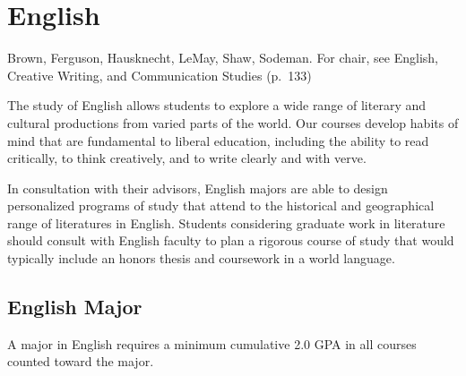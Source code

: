 \documentclass[
  letterpaper,
]{scrbook}
\begin{document}
\section{English}\label{english}

Brown, Ferguson, Hausknecht, LeMay, Shaw, Sodeman. For chair, see
English, Creative Writing, and Communication Studies (p.~133)

The study of English allows students to explore a wide range of literary
and cultural productions from varied parts of the world. Our courses
develop habits of mind that are fundamental to liberal education,
including the ability to read critically, to think creatively, and to
write clearly and with verve.

In consultation with their advisors, English majors are able to design
personalized programs of study that attend to the historical and
geographical range of literatures in English. Students considering
graduate work in literature should consult with English faculty to plan
a rigorous course of study that would typically include an honors thesis
and coursework in a world language.

\subsection{English Major}\label{english-major}

A major in English requires a minimum cumulative 2.0 GPA in all courses
counted toward the major.
\end{document}
